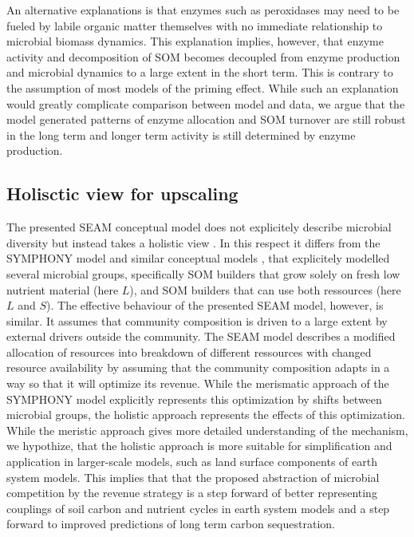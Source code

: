 An alternative explanations is that enzymes such as peroxidases may need to be
fueled by labile organic matter themselves \citep{Rousk14} with no immediate
relationship to microbial biomass dynamics.
This explanation implies, however, that enzyme activity and decomposition of SOM
becomes decoupled from enzyme production and microbial dynamics to a large
extent in the short term.
This is contrary to the assumption of most models of the priming effect. While
such an explanation would greatly complicate comparison between model and data,
we argue that the model generated patterns of enzyme allocation and SOM turnover
are still robust in the long term and longer term activity is still determined
by enzyme production.
 
\subsection{Holisctic view for upscaling
\label{sec:Holistic}} 

The presented SEAM conceptual model does not explicitely describe microbial
diversity but instead takes a holistic view \citep{Panikov10}. In this respect
it differs from the SYMPHONY model \citep{Perveen14} and similar conceptual
models \citep{Fontaine03}, that explicitely modelled several microbial groups,
specifically SOM builders that grow solely on fresh low nutrient material (here
$L$), and SOM builders that can use both ressources (here $L$ and $S$). The
effective behaviour of the presented SEAM model, however, is similar. It assumes
that community composition is driven to a large extent by external drivers
outside the community. The SEAM model describes a modified allocation of
resources into breakdown of different ressources with changed resource
availability by assuming that the community composition adapts in a way so that
it will optimize its revenue.
While the merismatic approach of the SYMPHONY model explicitly represents this
optimization by shifts between microbial groups, the holistic approach
represents the effects of this optimization.
While the meristic approach gives more detailed understanding of the mechanism,
we hypothize, that the holistic approach is more suitable for simplification
\citep{Wutzler13} and application in larger-scale models, such as land surface
components of earth system models.
This implies that that the proposed abstraction of microbial competition by the
revenue strategy is a step forward of better representing couplings of soil
carbon and nutrient cycles in earth system models and a step forward to improved
predictions of long term carbon sequestration.

